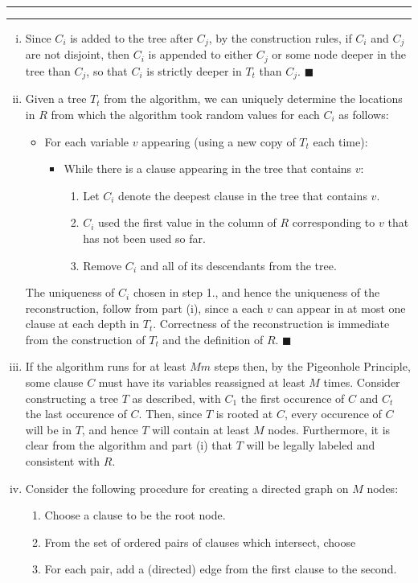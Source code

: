 \documentclass[11pt]{article}
\newcounter{questionCounter}
\newcounter{partCounter}[questionCounter]
\newenvironment{question}[2][\arabic{questionCounter}]{%
    \setcounter{partCounter}{0}%
    \vspace{.25in} \hrule \vspace{0.5em}%
        \noindent{\bf #2}%
    \vspace{0.8em} \hrule \vspace{.10in}%
    \addtocounter{questionCounter}{1}%
}{}
\renewcommand{\qed}{\quad $\blacksquare$}
\begin{document}
\begin{question}{Problem 3}
\begin{enumerate}[(i)]
\item Since $C_i$ is added to the tree after $C_j$, by the construction rules,
if $C_i$ and $C_j$ are not disjoint, then $C_i$ is appended to either $C_j$ or
some node deeper in the tree than $C_j$, so that $C_i$ is strictly deeper in
$T_t$ than $C_j$. \qed

\item
Given a tree $T_t$ from the algorithm, we
can uniquely determine the locations in $R$ from which the algorithm took
random values for each $C_i$ as follows:
\begin{itemize}
\item For each variable $v$ appearing (using a new copy of $T_t$ each time):
\renewcommand{\labelitemii}{$\bullet$}
\begin{itemize}
\item While there is a clause appearing in the tree that contains $v$:
\begin{enumerate}[1.]
\item Let $C_i$ denote the deepest clause in the tree that contains $v$.
\item $C_i$ used the first value in the column of $R$ corresponding to $v$ that
has not been used so far.
\item Remove $C_i$ and all of its descendants from the tree.
\end{enumerate}
\end{itemize}
\end{itemize}
The uniqueness of $C_i$ chosen in step 1., and hence the uniqueness of the
reconstruction, follow from part (i), since a each $v$ can appear in at most
one clause at each depth in $T_t$. Correctness of the reconstruction is
immediate from the construction of $T_t$ and the definition of $R$. \qed

\item If the algorithm runs for at least $Mm$ steps then, by the Pigeonhole
Principle, some clause $C$ must have its variables reassigned at least $M$
times. Consider constructing a tree $T$ as described, with $C_1$ the first
occurence of $C$ and $C_t$ the last occurence of $C$. Then, since $T$ is rooted
at $C$, every occurence of $C$ will be in $T$, and hence $T$ will contain at
least $M$ nodes. Furthermore, it is clear from the algorithm and part (i) that
$T$ will be legally labeled and consistent with $R$.

\item Consider the following procedure for creating a directed graph on $M$
nodes:
\begin{enumerate}[(1)]
\item Choose a clause to be the root node.
\item From the set of ordered pairs of clauses which intersect, choose
\item For each pair, add a (directed) edge from the first clause to the second.
\end{enumerate}


\end{enumerate}
\end{question}
\end{document}

